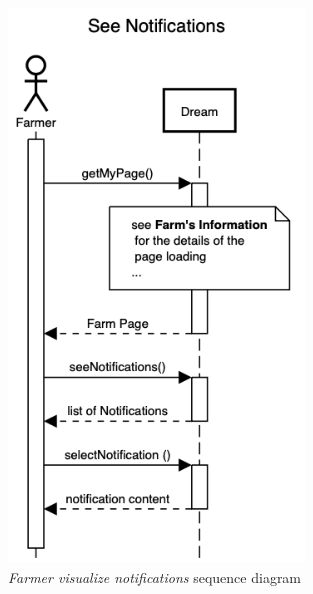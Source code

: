 \begin{enumerate}
\begin{figure}[H]
\begin{center}
        \includegraphics[width=0.7\textwidth]{sequence/SeeNotifications.png}
        \caption{\emph{Farmer visualize notifications} sequence diagram}
        \label{fig:sequence8}
        \end{center}
    \end{figure}


\end{enumerate}
